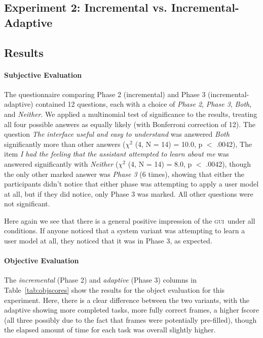 \documentclass[11pt]{article}
\newcommand{\ui}[0]{\textsc{gui}}
\begin{document}
\subsection{Experiment 2: Incremental vs. Incremental-Adaptive}
\label{section:exp2}


\subsection{Results}

\paragraph{Subjective Evaluation} The questionnaire comparing Phase 2 (incremental) and Phase 3 (incremental-adaptive) contained 12 questions, each with a choice of \emph{Phase 2}, \emph{Phase 3}, \emph{Both}, and \emph{Neither}.  We applied a multinomial test of significance to the results, treating all four possible answers as equally likely (with Bonferroni correction of 12). The question \emph{The interface useful and easy to understand} was answered \emph{Both} significantly more than other answers  ($ \chi^2 $ (4, N = 14) = 10.0, p $<$ .0042), The item \emph{I had the feeling that the assistant attempted to learn about me} was answered significantly with \emph{Neither} ($ \chi^2 $ (4, N = 14) = 8.0, p $<$ .0042), though the only other marked answer was \emph{Phase 3} (6 times), showing that either the participants didn't notice that either phase was attempting to apply a user model at all, but if they did notice, only Phase 3 was marked. All other questions were not significant.

Here again we see that there is a general positive impression of the \ui\ under all conditions. If anyone noticed that a system variant was attempting to learn a user model at all, they noticed that it was in Phase 3, as expected. 

\paragraph{Objective Evaluation} The \emph{incremental} (Phase 2) and \emph{adaptive} (Phase 3) columns in Table~\ref{tab:objscores} show the results for the object evaluation for this experiment. Here, there is a clear difference between the two variants, with the adaptive showing more completed tasks, more fully correct frames, a higher fscore (all three possibly due to the fact that frames were potentially pre-filled), though the elapsed amount of time for each task was overall slightly higher. 
\end{document}

